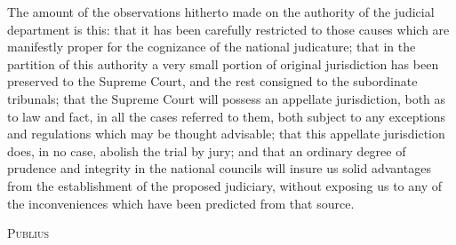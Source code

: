 The amount of the observations hitherto made on the authority of the judicial department is this: that it has been carefully restricted to those causes which are manifestly proper for the cognizance of the national judicature; that in the partition of this authority a very small portion of original jurisdiction has been preserved to the Supreme Court, and the rest consigned to the subordinate tribunals; that the Supreme Court will possess an appellate jurisdiction, both as to law and fact, in all the cases referred to them, both subject to any exceptions and regulations which may be thought advisable; that this appellate jurisdiction does, in no case, abolish the trial by jury; and that an ordinary degree of prudence and integrity in the national councils will insure us solid advantages from the establishment of the proposed judiciary, without exposing us to any of the inconveniences which have been predicted from that source.

\vspace{.5cm}
\textsc{Publius}

\vspace{1.5cm}

